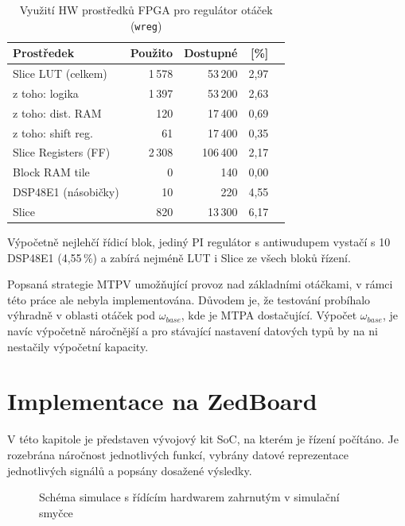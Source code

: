 \begin{table}[htbp]
\centering

\begin{tabular}{lrrrr}
\toprule
\textbf{Prostředek} & \textbf{Použito} & \textbf{Dostupné} & \textbf{[\%]} \\
\midrule
Slice LUT (celkem)       & 1\,578 & 53\,200  & 2{,}97 \\
\quad z toho: logika     & 1\,397 & 53\,200  & 2{,}63 \\
\quad z toho: dist. RAM  &   120  & 17\,400  & 0{,}69 \\
\quad z toho: shift reg. &    61  & 17\,400  & 0{,}35 \\
Slice Registers (FF)     & 2\,308 & 106\,400 & 2{,}17 \\
Block RAM tile           &     0  &    140   & 0{,}00 \\
DSP48E1 (násobičky)      &    10  &    220   & 4{,}55 \\
Slice                    &   820  & 13\,300  & 6{,}17 \\
\bottomrule
\end{tabular}
\caption{Využití HW prostředků FPGA pro regulátor otáček (\texttt{wreg})}
\label{tab:hw_hdlwreg}
\end{table}

Výpočetně nejlehčí řídicí blok, jediný PI regulátor s antiwudupem vystačí s 10 DSP48E1 (4{,}55\,\%) a zabírá nejméně LUT i Slice ze všech bloků řízení.

Popsaná strategie MTPV umožňující provoz nad základními otáčkami, v rámci této práce ale nebyla implementována. Důvodem je,
že testování probíhalo výhradně v oblasti otáček pod $\omega_{base}$, kde je
MTPA dostačující. Výpočet $\omega_{base}$,  je navíc výpočetně náročnější a pro stávající nastavení datových typů by na ni nestačily výpočetní kapacity.



\section{Implementace na ZedBoard}

V této kapitole je představen vývojový kit SoC, na kterém je řízení počítáno. Je rozebrána náročnost jednotlivých funkcí, vybrány datové reprezentace jednotlivých signálů a popsány dosažené výsledky.

\begin{figure}[!h]
    \centering
    \resizebox{0.8 \textwidth}{!}{
    }
    \caption{Schéma simulace s řídícím hardwarem zahrnutým v simulační smyčce}
    \label{fig:HIL}
\end{figure}

